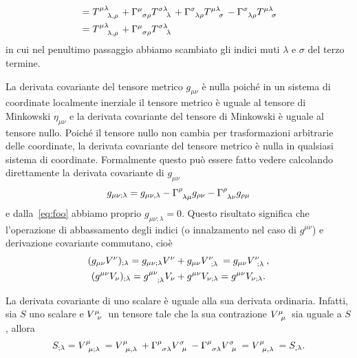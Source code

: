 \begin{enumerate}
\begin{equation}
\begin{split}
      &= \tensor{T}{^{\mu\lambda}_{\lambda,\rho}} +
      \tensor{\Gamma}{^{\mu}_{\sigma\rho}}\tensor{T}{^{\sigma\lambda}_{\lambda}}
      + \tensor{\Gamma}{^{\sigma}_{\lambda\rho}}
      \tensor{T}{^{\mu\lambda}_{\sigma}} -
      \tensor{\Gamma}{^{\sigma}_{\lambda\rho}}
      \tensor{T}{^{\mu\lambda}_{\sigma}} \\
      &= \tensor{T}{^{\mu\lambda}_{\lambda,\rho}} +
      \tensor{\Gamma}{^{\mu}_{\sigma\rho}}\tensor{T}{^{\sigma\lambda}_{\lambda}}
    \end{split}
  \end{equation}
  in cui nel penultimo passaggio abbiamo scambiato gli indici muti $\lambda$ e
  $\sigma$ del terzo termine.
\end{enumerate}

La derivata covariante del tensore metrico $g_{\mu\nu}$ è
nulla poiché in un sistema di coordinate localmente inerziale il tensore metrico
è uguale al tensore di Minkowski
$\eta_{\mu\nu}$ e la derivata covariante del tensore di Minkowski è uguale al
tensore nullo.  Poiché il tensore nullo non cambia per trasformazioni arbitrarie
delle coordinate, la derivata covariante del tensore metrico è nulla in
qualsiasi sistema di coordinate.  Formalmente questo può essere fatto vedere
calcolando direttamente la derivata covariante di $g_{\mu\nu}$
\begin{equation}
  g_{\mu\nu;\lambda} = g_{\mu\nu,\lambda} -
  \tensor{\Gamma}{^{\rho}_{\lambda\mu}}g_{\rho\nu} -
  \tensor{\Gamma}{^{\rho}_{\lambda\nu}}g_{\rho\mu}
\end{equation}
e dalla~\eqref{eq:foo} abbiamo proprio $g_{\mu\nu;\lambda} = 0$.  Questo
risultato significa che l'operazione di abbassamento degli indici (o
innalzamento nel caso di $g^{\mu\nu}$) e derivazione covariante commutano, cioè
\begin{subequations}
  \begin{gather}
    (g_{\mu\nu}V^{\nu})_{;\lambda} = g_{\mu\nu;\lambda}V^{\nu} +
    g_{\mu\nu}\tensor{V}{^{\nu}_{;\lambda}} =
    g_{\mu\nu}\tensor{V}{^{\nu}_{;\lambda}}, \\
    (g^{\mu\nu}V_{\nu})_{;\lambda} = \tensor{g}{^{\mu\nu}_{;\lambda}}V_{\nu} +
    g^{\mu\nu}V_{\nu;\lambda} = g^{\mu\nu}V_{\nu;\lambda}.
  \end{gather}
\end{subequations}

La derivata covariante di uno scalare è uguale alla sua derivata ordinaria.
Infatti, sia $S$ uno scalare e $\tensor{V}{^{\mu}_{\nu}}$ un tensore tale che la
sua contrazione $\tensor{V}{^{\mu}_{\mu}}$ sia uguale a $S$, allora
\begin{equation}
  S_{;\lambda} = \tensor{V}{^{\mu}_{\mu;\lambda}} =
  \tensor{V}{^{\mu}_{\mu,\lambda}} + \tensor{\Gamma}{^{\mu}_{\sigma\lambda}}
  \tensor{V}{^{\sigma}_{\mu}} - \tensor{\Gamma}{^{\mu}_{\sigma\lambda}}
  \tensor{V}{^{\sigma}_{\mu}} = \tensor{V}{^{\mu}_{\mu,\lambda}} = S_{,\lambda}.
\end{equation}

